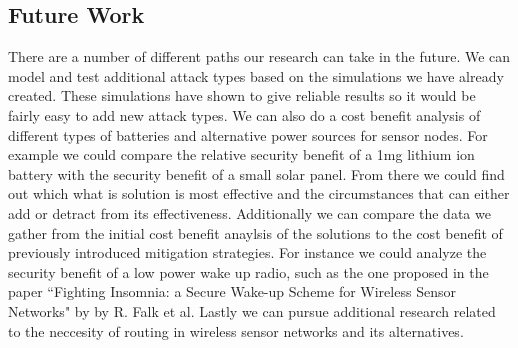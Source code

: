 \subsection{Future Work}
There are a number of different paths our research can take in the future.  We can model and test additional attack types based on the simulations we have already created. These simulations have shown to give reliable results so it would be fairly easy to add new attack types. We can also do a cost benefit analysis of different types of batteries and alternative power sources for sensor nodes. For example we could compare the relative security benefit of a 1mg lithium ion battery with the security benefit of a small solar panel.  From there we could find out which what is solution is most effective and the circumstances that can either add or detract from its effectiveness. Additionally we can compare the data we gather from the initial cost benefit anaylsis of the solutions to the cost benefit of previously introduced mitigation strategies.  For instance we could analyze the security benefit of a low power wake up radio, such as the one proposed in the paper ``Fighting Insomnia: a Secure Wake-up Scheme for Wireless Sensor Networks" by by R. Falk et al.\cite{5211020} Lastly we can pursue additional research related to the neccesity of routing in wireless sensor networks and its alternatives.

